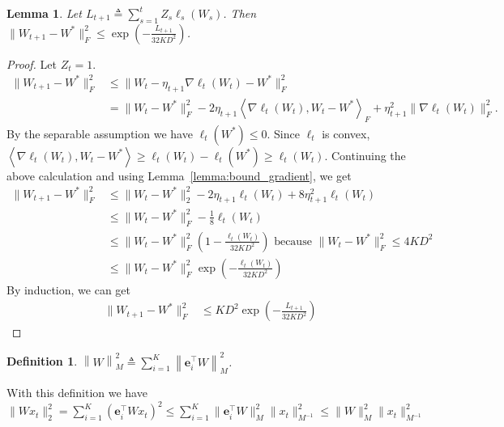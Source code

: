 \documentclass{article}
\newcommand{\nb}{\nabla}
\newcommand{\e}{\mathbf{e}}
\newcommand{\inner}[1]{ \left\langle {#1} \right\rangle }
\newcommand{\norm}[1]{\left\|{#1}\right\|}
\newtheorem{lemma}[theorem]{Lemma}
\newtheorem{definition}[theorem]{Definition}
\begin{document}
\begin{lemma}
\label{lemma:decreasing error}
Let $L_{t+1}\triangleq \sum_{s=1}^t Z_s\ell_s(W_s)$. Then 
$\|W_{t+1}-W^*\|_F^2 \leq \exp\left(-\frac{L_{t+1}}{32KD^2}\right)$. 
\end{lemma}
\begin{proof}
Let $Z_{t}=1$. 
\begin{align*}
    \|W_{t+1}-W^*\|_F^2 &\leq \|W_t - \eta_{t+1}\nb\ell_t(W_t)-W^*\|_F^2 \\
    & = \| W_t - W^* \|_F^2 - 2\eta_{t+1}\inner{\nb\ell_t(W_t),W_t-W^*}_F + \eta_{t+1}^2\|\nb\ell_t(W_t)\|_F^2.  
\end{align*}
By the separable assumption we have $\ell_t(W^*)\leq 0$. Since $\ell_t$ is convex, $\inner{\nb\ell_t(W_t), W_t-W^*} \geq \ell_t(W_t)-\ell_t(W^*)\geq \ell_t(W_t)$. Continuing the above calculation and using Lemma~\ref{lemma:bound_gradient}, we get 
\begin{align*}
    \|W_{t+1}-W^*\|_F^2 &\leq \|W_t-W^*\|_2^2 - 2\eta_{t+1}\ell_t(W_t) + 8\eta_{t+1}^2 \ell_t(W_t) \\ 
    &\leq \|W_t-W^*\|_F^2 - \frac{1}{8}\ell_{t}(W_t) \\
    &\leq \|W_t-W^*\|_F^2 \left(1-\frac{\ell_t(W_t)}{32KD^2}\right)  \text{\ \ \ \ because $\|W_t-W^*\|_F^2\leq 4KD^2$} \\
    &\leq \|W_t-W^*\|_F^2 \exp\left(-\frac{\ell_t(W_t)}{32KD^2}\right)
\end{align*}
By induction, we can get
\begin{align*}
    \|W_{t+1}-W^*\|_F^2 &\leq KD^2 \exp\left( -\frac{L_{t+1}}{32KD^2} \right) 
\end{align*}
\end{proof}

\begin{definition}
$\norm{W}_{M}^2\triangleq \sum_{i=1}^K \norm{\e_i^\top W}_{M}^2$.
\end{definition}
With this definition we have $\|Wx_t\|_2^2 = \sum_{i=1}^K (\e_i^\top Wx_t)^2 \leq \sum_{i=1}^K \|\e_i^\top W\|_M^2 \|x_t\|_{M^{-1}}^2\leq \|W\|_M^2 \|x_t\|_{M^{-1}}^2$
\end{document}
